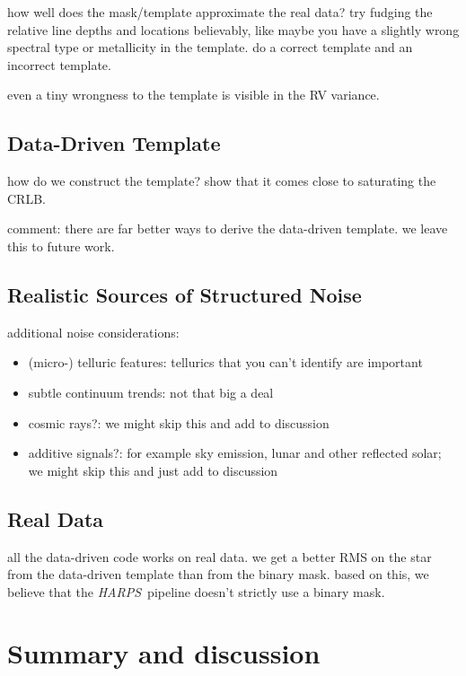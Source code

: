 \documentclass[modern]{aastex62}
\newcommand{\acronym}[1]{{\small{#1}}}
\newcommand{\project}[1]{\textsl{#1}}
\newcommand{\HARPS}{\project{\acronym{HARPS}}}
\begin{document}
how well does the mask/template approximate the real data? try fudging the relative line depths and locations believably, like maybe you have a slightly wrong spectral type or metallicity in the template. do a correct template and an incorrect template.

even a tiny wrongness to the template is visible in the RV variance.

\subsection{Data-Driven Template}

how do we construct the template? show that it comes close to saturating the CRLB.

comment: there are far better ways to derive the data-driven template. we leave this to future work.

\subsection{Realistic Sources of Structured Noise}

additional noise considerations:
\begin{itemize}
\item (micro-) telluric features: tellurics that you can't identify are important
\item subtle continuum trends: not that big a deal
\item cosmic rays?: we might skip this and add to discussion
\item additive signals?: for example sky emission, lunar and other reflected solar; we might skip this and just add to discussion
\end{itemize}

\subsection{Real Data}

all the data-driven code works on real data. we get a better RMS on the star from the data-driven template than from the binary mask. based on this, we believe that the \HARPS\ pipeline doesn't strictly use a binary mask.

\section{Summary and discussion}
\label{s:summary}
\end{document}
